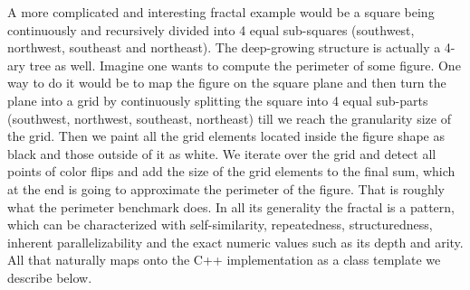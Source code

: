 \quad A more complicated and interesting fractal example would be a square being continuously and recursively divided into 4 equal sub-squares (southwest, northwest, southeast and northeast). The deep-growing structure is actually a 4-ary tree as well. Imagine one wants to compute the perimeter of some figure. One way to do it would be to map the figure on the square plane and then turn the plane into a grid by continuously splitting the square into 4 equal sub-parts (southwest, northwest, southeast, northeast) till we reach the granularity size of the grid. Then we paint all the grid elements located inside the figure shape as black and those outside of it as white. We iterate over the grid and detect all points of color flips and add the size of the grid elements to the final sum, which at the end is going to approximate the perimeter of the figure. That is roughly what the perimeter benchmark does.\newline\null
\quad In all its generality the fractal is a pattern, which can be characterized with self-similarity, repeatedness, structuredness, inherent parallelizability and the exact numeric values such as its depth and arity. All that naturally maps onto the C++ implementation as a class template we describe below.
